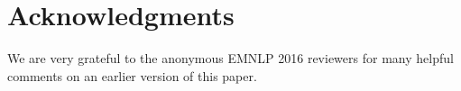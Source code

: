 \section*{Acknowledgments}
We are very grateful to the anonymous EMNLP 2016 reviewers for many helpful comments on an earlier version of this paper.



 


\if \buildtarget \buildamta    
    \small
    
\else \if \buildtarget \buildemnlp
    
    
\else \if \buildtarget \buildhcomp    
    
\else
\fi \fi \fi




